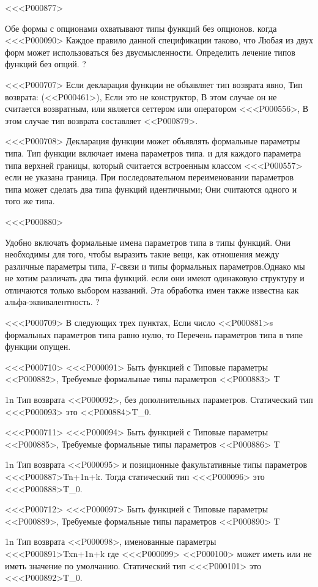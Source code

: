 {{{%
<<<P000877>{%
Обе формы с опционами охватывают типы функций без опционов.
когда <<<P000090>
Каждое правило данной спецификации таково, что
Любая из двух форм может использоваться без двусмысленности.
Определить лечение типов функций без опций.%
?

<<<P000707>%
Если декларация функции не объявляет тип возврата явно,
Тип возврата: \DYNAMIC{} (<<P000461>),
Если это не конструктор,
В этом случае он не считается возвратным,
или является сеттером или оператором <<<P000556>,
В этом случае тип возврата составляет <<P000879>.

<<<P000708>%
Декларация функции может объявлять формальные параметры типа.
Тип функции включает имена параметров типа.
и для каждого параметра типа верхней границы,
который считается встроенным классом <<<P000557>
если не указана граница.
При последовательном переименовании параметров типа
может сделать два типа функций идентичными;
Они считаются одного и того же типа.

<<<P000880>{%
Удобно включать формальные имена параметров типа в типы функций.
Они необходимы для того, чтобы выразить такие вещи, как отношения между
различные параметры типа, F-связи и типы формальных параметров.Однако мы не хотим различать два типа функций.
если они имеют одинаковую структуру и отличаются только выбором названий.
Эта обработка имен также известна как альфа-эквивалентность.
?

<<<P000709>%
В следующих трех пунктах,
Если число <<P000881>{s} формальных параметров типа равно нулю, то
Перечень параметров типа в типе функции опущен.

<<<P000710>%
<<<P000091> Быть функцией с
Типовые параметры <<P000882>,
Требуемые формальные типы параметров <<P000883> T}{1}{n}
Тип возврата <<P000092>,
без дополнительных параметров.
Статический тип <<<P000093> это
<<P000884>{T_0}.

<<<P000711>%
<<<P000094> Быть функцией с
Типовые параметры <<P000885>,
Требуемые формальные типы параметров <<P000886> T}{1}{n}
Тип возврата <<P000095>
и позиционные факультативные типы параметров <<<P000887>{T}{n+1}{n+k}.
Тогда статический тип <<<P000096> это
<<<P000888>{T_0}.

<<<P000712>%
<<<P000097> Быть функцией с
Типовые параметры <<P000889>,
Требуемые формальные типы параметров <<P000890> T}{1}{n}
Тип возврата <<P000098>,
именованные параметры <<<P000891>{T}{x}{n+1}{n+k}
где <<<P000099> <<P000100> может иметь или не иметь значение по умолчанию.
Статический тип <<<P000101> это
<<<P000892>{T_0}.

}}

